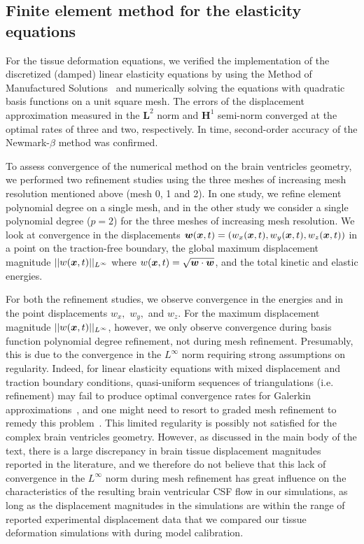 \documentclass{template}
\begin{document}
\subsection{Finite element method for the elasticity equations}\label{sec:tissue_model_verification}
For the tissue deformation equations, we verified the implementation of the
discretized (damped) linear elasticity equations by using the Method of Manufactured Solutions~\citep{Roache2001CodeSolutions}
and numerically solving the equations with quadratic basis functions on a unit square mesh.
The errors of the displacement approximation measured in the $\bm{L}^2$ norm and
$\bm{H}^1$ semi-norm converged at the optimal rates of three
and two, respectively. In time, second-order accuracy of the 
Newmark-$\beta$ method was confirmed.

To assess convergence of the numerical method on the brain ventricles geometry,
we performed two refinement studies using the three meshes of increasing
mesh resolution mentioned above (mesh 0, 1 and 2). 
In one study, we refine element polynomial degree on a single mesh,
and in the other study we consider a single polynomial degree ($p=2$) for the three 
meshes of increasing mesh resolution.
We look at convergence in the displacements
$\bm{w}(\bm{x}, t) = (w_x(\bm{x}, t), w_y(\bm{x}, t), w_z(\bm{x}, t))$
in a point on the traction-free boundary,
the global maximum displacement magnitude $||w(\bm{x}, t)||_{L^{\infty}}$
where $w(\bm{x}, t) = \sqrt{\bm{w}\cdot\bm{w}}$, and the total kinetic and elastic energies.

For both the refinement studies, we observe convergence in the energies and in the
point displacements $w_x,$ $w_y,$ and $w_z.$
For the maximum displacement magnitude $||w(\bm{x}, t)||_{L^{\infty}}$, however,
we only observe convergence during basis function polynomial degree refinement,
not during mesh refinement. Presumably, this is due to the convergence
in the $L^{\infty}$ norm requiring strong assumptions on regularity.
Indeed, for linear elasticity equations with 
mixed displacement and traction boundary conditions, quasi-uniform sequences of
triangulations (i.e. refinement) may fail to produce optimal convergence rates
for Galerkin approximations~\citep{mazzucato2010well, wahlbin1984sharpness}, and
one might need to resort to graded mesh refinement to remedy this problem~\citep{apel1998finite}.
This limited regularity is possibly not satisfied for the complex brain
ventricles geometry. However, as discussed in the main body of the text,
there is a large discrepancy in brain tissue displacement magnitudes 
reported in the literature, and we therefore do not believe that this lack of
convergence in the $L^{\infty}$ norm during mesh refinement 
has great influence on the characteristics of the resulting
brain ventricular CSF flow in our simulations, as long as the displacement
magnitudes in the simulations are within the range of reported experimental
displacement data that we compared our tissue deformation simulations with
during model calibration.
\end{document}
